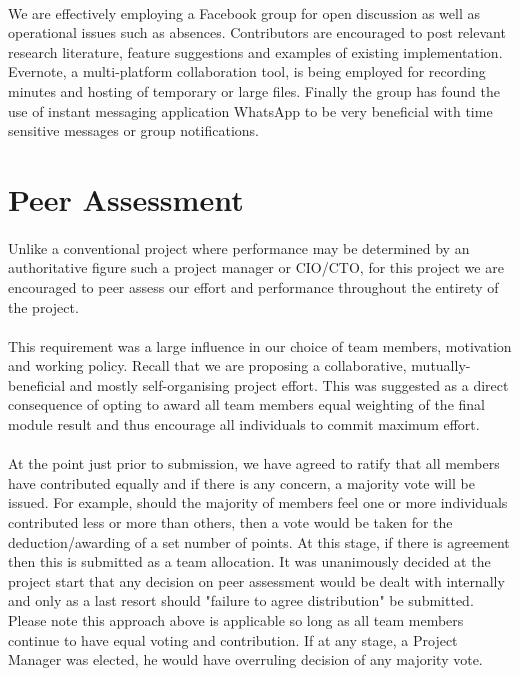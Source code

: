 \documentclass[11pt,a4paper]{article}
\begin{document}
\paragraph{}
We are effectively employing a Facebook group for open discussion as well as operational issues such as absences.  Contributors are encouraged to post relevant research literature, feature suggestions and examples of existing implementation.  Evernote, a multi-platform collaboration tool, is being employed for recording minutes and hosting of temporary or large files.  Finally the group has found the use of instant messaging application WhatsApp to be very beneficial with time sensitive messages or group notifications.

\pagebreak

\section{Peer Assessment}
\paragraph{}
Unlike a conventional project where performance may be determined by an authoritative figure such a project manager or CIO/CTO, for this project we are encouraged to peer assess our effort and performance throughout the entirety of the project.
\paragraph{}
This requirement was a large influence in our choice of team members, motivation and working policy.  Recall that we are proposing a collaborative, mutually-beneficial and mostly self-organising project effort.  This was suggested as a direct consequence of opting to award all team members equal weighting of the final module result and thus encourage all individuals to commit maximum effort. 
\paragraph{}
At the point just prior to submission, we have agreed to ratify that all members have contributed equally and if there is any concern, a majority vote will be issued.  For example, should the majority of members feel one or more individuals contributed less or more than others, then a vote would be taken for the deduction/awarding of a set number of points.  At this stage, if there is agreement then this is submitted as a team allocation.  It was unanimously decided at the project start that any decision on peer assessment would be dealt with internally and only as a last resort should "failure to agree distribution" be submitted.  Please note this approach above is applicable so long as all team members continue to have equal voting and contribution.  If at any stage, a Project Manager was elected, he would have overruling decision of any majority vote.
\end{document}
